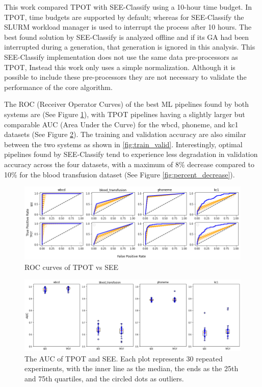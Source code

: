 \documentclass[acmsmall,screen]{acmart}
\begin{document}
This work compared TPOT with SEE-Classify using a 10-hour time budget. In TPOT, time budgets are supported by default; whereas for SEE-Classify the SLURM workload manager is used to interrupt the process after 10 hours. The best found solution by SEE-Classify is analyzed offline and if its GA had been interrupted during a generation, that generation is ignored in this analysis. This SEE-Classify implementation does not use the same data pre-processors as TPOT, Instead this work only uses a simple normalization.  Although it is possible to include these pre-processors they are not necessary to validate the performance of the core algorithm.  


The ROC (Receiver Operator Curves) of the best ML pipelines found by both systems are (See Figure \ref{fig:roc}), with TPOT pipelines having a slightly larger but comparable AUC (Area Under the Curve) for the wbcd, phoneme, and kc1 datasets (See Figure \ref{fig:auc}). The training and validation accuracy are also similar between the two systems as shown in \ref{fig:train_valid}. Interestingly, optimal pipelines found by SEE-Classify tend to experience less degradation in validation accuracy across the four datasets, with a maximum of 8\% decrease compared to 10\% for the blood transfusion dataset (See Figure \ref{fig:percent_decrease}).


\begin{figure}[h]
  \centering
  \includegraphics[width=13cm]{figures_2/roc_see_tpot_4.png}
  \caption{ROC curves of TPOT vs SEE}
  \label{fig:roc}
\end{figure}


\begin{figure}[h]
  \centering
  \includegraphics[width=13cm]{figures_2/auc_see_tpot_4.png}
  \caption{The AUC of TPOT and SEE. Each plot represents 30 repeated experiments, with the inner line as the median, the ends as the 25th and 75th quartiles, and the circled dots as outliers.}
  \label{fig:auc}
\end{figure}
\end{document}
